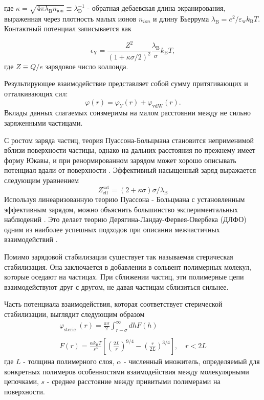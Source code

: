 где $\kappa=\sqrt{4 \pi \lambda_{\mathrm{B}} n_{\mathrm{ion}}} \equiv \lambda_{\mathrm{D}}^{-1}$ - обратная дебаевская длина экранирования, выраженная через плотность малых ионов $n_{ion}$ и длину Бьеррума $\lambda_{\mathrm{B}}=e^{2} / \varepsilon_{\mathrm{w}} k_{\mathrm{B}} T$. Контактный потенциал записывается как 

\begin{equation}
\epsilon_{\mathrm{Y}}=\frac{Z^{2}}{(1+\kappa \sigma / 2)^{2}} \frac{\lambda_{\mathrm{B}}}{\sigma} k_{\mathrm{B}} T,
\end{equation}
где $Z \equiv Q / e$ зарядовое число коллоида.

Результирующее взаимодействие представляет собой сумму притягивающих и отталкивающих сил:
\begin{equation}
\varphi(r)=\varphi_{Y}(r)+\varphi_{\mathrm{vdW}}(r).
\end{equation}
Вклады данных слагаемых соизмеримы на малом расстоянии между не сильно заряженными частицами.

С ростом заряда частиц, теория Пуассона-Больцмана становится неприменимой вблизи поверхности частицы, однако на дальних расстояния по прежнему имеет форму Юкавы, и при ренормированном зарядом может хорошо описывать потенциал вдали от поверхности \cite{Yur55}. Эффективный насыщенный заряд выражается следующим уравнением \cite{Yur56}
\begin{equation}
Z_{\mathrm{eff}}^{\mathrm{sat}}=(2+\kappa \sigma) \sigma / \lambda_{\mathrm{B}}
\end{equation}
Используя линеаризованную теорию Пуассона - Больцмана с установленным эффективным зарядом, можно объяснить большинство экспериментальных наблюдений \cite{Yur57, Yur58, Yur59}. Это делает теорию Дерягина-Ландау-Фервея-Овербека (ДЛФО) одним из наиболее успешных подходов при описании межчастичных взаимодействий \cite{Yur49, Yur60, Yur61}. 

Помимо зарядовой стабилизации существует так называемая стерическая стабилизация. Она заключается в добавлении в сольвент полимерных молекул, которые оседают на частицах. При сближении частиц, эти полимерные цепи взаимодействуют друг с другом, не давая частицам сблизиться сильнее. 

Часть потенциала взаимодействия, которая соответствует стерической стабилизации, выглядит следующим образом \cite{Yur31}
\begin{equation}
\begin{array}{l}
\varphi_{\text {steric }}(r)=\frac{\pi \sigma}{2} \int_{r-\sigma}^{\infty} d h F(h) \\
\\
F(r)=\frac{\alpha k_{\mathrm{B}} T}{s^{3}}\left[\left(\frac{2 L}{r}\right)^{9 / 4}-\left(\frac{r}{2 L}\right)^{3 / 4}\right], \quad r<2 L
\end{array}
\label{eqStericStabl}
\end{equation}
где $L$ - толщина полимерного слоя, $\alpha$ - численный множитель, определяемый для конкретных полимеров
особенностями взаимодействия между молекулярными цепочками, $s$ - среднее расстояние между привитыми полимерами на поверхности.

